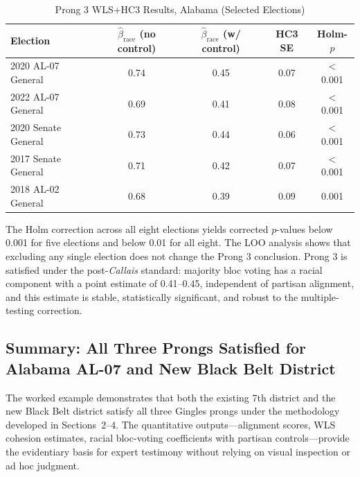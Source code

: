 \begin{table}[h]
\centering
\caption{Prong 3 WLS+HC3 Results, Alabama (Selected Elections)}
\label{tab:alabama-prong3}
\begin{tabular}{lcccc}
\toprule
Election & $\hat{\beta}_{\text{race}}$ (no control) & $\hat{\beta}_{\text{race}}$ (w/ control) & HC3 SE & Holm-$p$ \\
\midrule
2020 AL-07 General & 0.74 & 0.45 & 0.07 & $<$0.001 \\
2022 AL-07 General & 0.69 & 0.41 & 0.08 & $<$0.001 \\
2020 Senate General & 0.73 & 0.44 & 0.06 & $<$0.001 \\
2017 Senate General & 0.71 & 0.42 & 0.07 & $<$0.001 \\
2018 AL-02 General & 0.68 & 0.39 & 0.09 & 0.001 \\
\bottomrule
\end{tabular}
\end{table}

The Holm correction across all eight elections yields corrected $p$-values
below 0.001 for five elections and below 0.01 for all eight.  The LOO analysis
shows that excluding any single election does not change the Prong 3 conclusion.
Prong 3 is satisfied under the post-\textit{Callais} standard: majority
bloc voting has a racial component with a point estimate of 0.41--0.45,
independent of partisan alignment, and this estimate is stable, statistically
significant, and robust to the multiple-testing correction.

\subsection{Summary: All Three Prongs Satisfied for Alabama AL-07 and New Black Belt District}

The worked example demonstrates that both the existing 7th district and the
new Black Belt district satisfy all three Gingles prongs under the methodology
developed in Sections~2--4.  The quantitative outputs---alignment scores,
WLS cohesion estimates, racial bloc-voting coefficients with partisan
controls---provide the evidentiary basis for expert testimony without relying
on visual inspection or ad hoc judgment.
